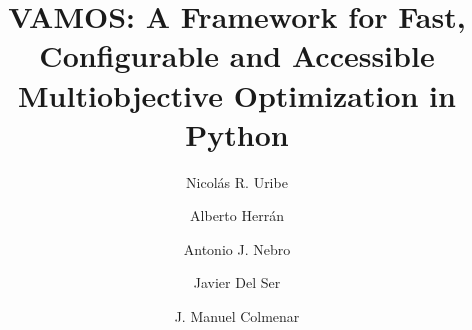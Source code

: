 \documentclass[final,5p,times,twocolumn]{elsarticle}
\begin{document}
\begin{frontmatter}

\title{VAMOS: A Framework for Fast, Configurable and Accessible Multiobjective Optimization in Python}



\author[URJC,cor]{Nicol\'{a}s R. Uribe}

\author[URJC]{Alberto Herr\'{a}n}

\author[LCC,ITIS]{Antonio J. Nebro}

\author[tec,upv]{Javier {Del Ser}}

\author[URJC,cor]{J. Manuel Colmenar}

\address[URJC]{Dept.\ Computer Sciences, Universidad Rey Juan Carlos,
C/. Tulip\'{a}n, s/n, M\'{o}stoles, 28933 (Madrid), Spain}

\address[LCC]{Dept.\ de Lenguajes y Ciencias de la Computaci\'{o}n, ITIS
Software, University of M\'{a}laga, ETSI Inform\'{a}tica, Campus de Teatinos,
29071 (M\'{a}laga), Spain}

\address[ITIS]{ITIS Software, Ada Byron Research Building,
C/. Arquitecto Francisco Pe\~{n}alosa, 18, University of M\'{a}laga, 29071
(M\'{a}laga), Spain}

\address[tec]{TECNALIA, 48160 Derio, Spain}

\address[upv]{University of the Basque Country (UPV/EHU), 48013 Bilbao, Spain}


\end{frontmatter}
\end{document}
